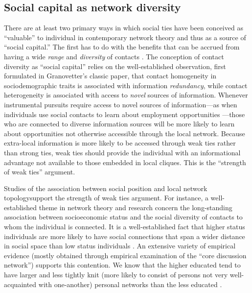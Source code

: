 \documentclass[12pt]{article}
\begin{document}
\subsection{Social capital as network diversity}
There are at least two primary ways in which social ties have been conceived as ``valuable'' to individual in contemporary network theory and thus as a source of ``social capital.'' The first has to do with the benefits that can be accrued from having a wide \emph{range} and \emph{diversity} of contacts \citep{burt82, burt83, burt92, lin_dumin86}. The conception of contact diversity as ``social capital'' relies on the well-established observation, first formulated in Granovetter's \citeyearpar{granovetter73} classic paper, that contact homogeneity in sociodemographic traits is associated with information \emph{redundancy}, while contact heterogeneity is associated with access to \emph{novel} sources of information. Whenever instrumental pursuits require access to novel sources of information---as when individuals use social contacts to learn about employment opportunities \citep{granovetter95}---those who are connected to diverse information sources will be more likely to learn about opportunities not otherwise accessible through the local network. Because extra-local information is more likely to be accessed through weak ties rather than strong ties, weak ties should provide the individual with an informational advantage not available to those embedded in local cliques. This is the ``strength of weak ties'' argument.

Studies of the association between social position and local network topologysupport the strength of weak ties argument. For instance, a well-established theme in network theory and research concern the long-standing association between socioeconomic status and the social diversity of contacts to whom the individual is connected. It is a well-established fact that higher status individuals are more likely to have social connections that span a wider distance in social space than low status individuals \citep{lin01a, lin01b}. An extensive variety of empirical evidence (mostly obtained through empirical examination of the ``core discussion network'') supports this contention. We know that the higher educated tend to have larger and less tightly knit (more likely to consist of persons not very well-acquainted with one-another) personal networks than the less educated \citep[129]{marsden87}.
\end{document}
